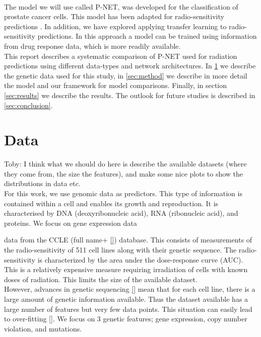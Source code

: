 \documentclass[NOTE, disdraft=true, UKenglish]{\DISCDTLATEXPATH UCLCDTDISdoc}
\begin{document}
\\ \indent 
The model we will use called P-NET\cite{elmarakeby_biologically_2021}, was developed for the classification of prostate cancer cells. This model has been adapted for radio-sensitivity predictions \cite{cosmin_thesis}. In addition, we have explored applying transfer learning \cite{transfer} to radio-sensitivity predictions. In this approach a model can be trained using information from drug response data, which is more readily available.
\\ \indent 
This report describes a systematic comparison of P-NET used for radiation predictions using different data-types and network architectures. 
In \ref{sec:data} we describe the genetic data used for this study, in \ref{sec:method} we describe in more detail the model and our framework for model comparisons. Finally, in section \ref{sec:results} we describe the results. The outlook for future studies is described in \ref{sec:conclusion}.
 
%
\section{Data}
\label{sec:data}
{\color{red}Toby: I think what we should do here is describe the available datasets (where they come from, the size the features), and make some nice plots to show the distributions in data etc.}
\\
For this work, we use genomic data as predictors. This type of information is contained within a cell and enables its growth and reproduction. It is characterised by DNA (deoxyribonucleic acid), RNA (ribonucleic acid), and proteins. We focus on gene expression data


data from the CCLE (full name+ \ref{}) database. This consists of measurements of the radio-sensitivity of 511 cell lines along with their genetic sequence. The radio-sensitivity is characterized by the area under the dose-response curve (AUC). This is a relatively expensive measure requiring irradiation of cells with known doses of radiation. This limits the size of the available dataset. 
\\ \indent However, advances in genetic sequencing \ref{} mean that for each cell line, there is a large amount of genetic information available. Thus the dataset available has a large number of features but very few data points. This situation can easily lead to over-fitting \ref{}. We focus on 3 genetic features; gene expression, copy number violation, and mutations.
\end{document}
